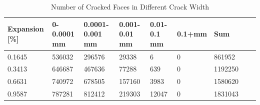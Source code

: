 
\begin{table}[ht!]
  \caption{Number of Cracked Faces in Different Crack Width}
    \centering
    \begin{tabular}{| p{2.0cm} | p{1.6cm} | p{1.6cm} | p{1.6cm} | p{1.6cm} | p{1.6cm} | p{1.6cm} | p{1.6cm} | p{2.0cm} | }
    \hline

	Expansion [\%] & 0-0.0001 mm & 0.0001-0.001 mm & 0.001-0.01 mm & 0.01-0.1 mm & 0.1+mm & Sum \\ \hline

    0.1645 &	536032 &	296576 &	29338 &	6 &	0 &	861952\\ \hline
    0.3413 &	646687 &	467636 &	77288 &	639 &	0 &	1192250\\ \hline
    0.6631 &	740972 &	678505 &	157160 &	3983 &	0 &	1580620\\ \hline
    0.9587 &	787281 &	812412 &	219303 &	12047 &	0 &	1831043\\ \hline

    \end{tabular}

    \label{}
\end{table}


